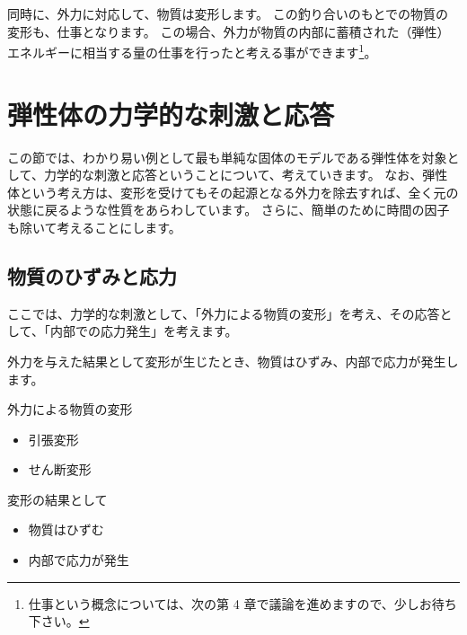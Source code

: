 \documentclass[uplatex,dvipdfmx,a4paper,11pt]{jsarticle}
\begin{document}
同時に、外力に対応して、物質は変形します。
この釣り合いのもとでの物質の変形も、仕事となります。
この場合、外力が物質の内部に蓄積された（弾性）エネルギーに相当する量の仕事を行ったと考える事ができます\footnote{
	仕事という概念については、次の第 4 章で議論を進めますので、少しお待ち下さい。
}。


\section{弾性体の力学的な刺激と応答}

この節では、わかり易い例として最も単純な固体のモデルである弾性体を対象として、力学的な刺激と応答ということについて、考えていきます。
なお、弾性体という考え方は、変形を受けてもその起源となる外力を除去すれば、全く元の状態に戻るような性質をあらわしています。
さらに、簡単のために時間の因子も除いて考えることにします。

\subsection{物質のひずみと応⼒}
ここでは、力学的な刺激として、「外力による物質の変形」を考え、その応答として、「内部での応力発生」を考えます。

外力を与えた結果として変形が生じたとき、物質はひずみ、内部で応力が発生します。
\large
	\begin{center}
		\begin{minipage}{0.38\textwidth}
			\begin{itembox}[l]{外力による物質の変形}
				\begin{itemize}
					\item 引張変形
					\item せん断変形
				\end{itemize}
			\end{itembox}
		\end{minipage}
		\begin{minipage}{0.38\textwidth}
			\begin{itembox}[l]{変形の結果として}
				\begin{itemize}
					\item 物質はひずむ
					\item 内部で応力が発生
				\end{itemize}
			\end{itembox}
		\end{minipage}
	\end{center}
\normalsize
\end{document}
